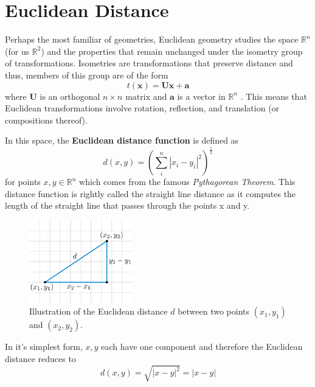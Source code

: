 \documentclass[a4paper, 12pt]{article}
\newcommand{\R}{\mathbb{R}}
\begin{document}
\section*{Euclidean Distance}
Perhaps the most familiar of geometries, Euclidean geometry studies the space $\R^n$ (for us $\R^2$) and the properties that remain unchanged under the isometry group of transformations. Isometries are transformations that preserve distance and thus, members of this group are of the form
\begin{equation*}
  t(\mathbf{x}) = \mathbf{U}\mathbf{x} + \mathbf{a}
\end{equation*}
where $\mathbf{U}$ is an orthogonal $n\times n$ matrix and $\mathbf{a}$ is a vector in $\R^n$ \cite{brannan}. This means that Euclidean transformations involve rotation, reflection, and translation (or compositions thereof).

In this space, the \textbf{Euclidean distance function} is defined as
\begin{equation*}
  d(x,y) = \left( \sum\limits_i^n |x_i-y_i|^2\right)^{\frac{1}{2}}
\end{equation*}
for points $x,y\in\R^n$ which comes from the famous \textit{Pythagorean Theorem}. This distance function is rightly called the straight line distance as it computes the length of the straight line that passes through the points x and y.
\begin{figure}[!hbt]
  \centering
  \includegraphics[width=0.4\textwidth]{EuclideanDistance}
  \caption{Illustration of the Euclidean distance $d$ between two points $(x_1,y_1)$ and $(x_2, y_2)$. }
  \label{fig:EuclideanDistance}
\end{figure}

In it's simplest form, $x,y$ each have one component and therefore the Euclidean distance reduces to
\begin{equation*}
  d(x,y) = \sqrt{|x-y|^2} = |x-y|
\end{equation*}
\end{document}
